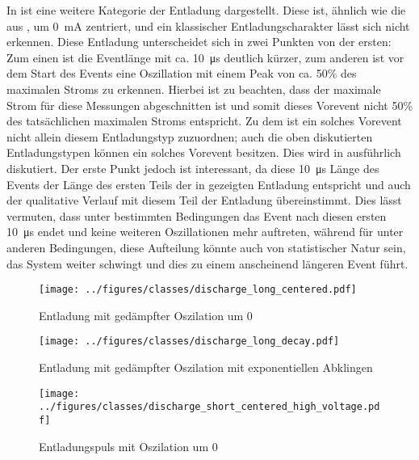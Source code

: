 In  ist eine weitere Kategorie der Entladung dargestellt. Diese ist, ähnlich wie die aus , um \SI{0}{\milli\ampere} zentriert, und ein klassischer Entladungscharakter lässt sich nicht erkennen. Diese Entladung unterscheidet sich in zwei Punkten von der ersten: Zum einen ist die Eventlänge mit ca. \SI{10}{\micro\second} deutlich kürzer, zum anderen ist vor dem Start des Events eine Oszillation mit einem Peak von ca. 50\% des maximalen Stroms zu erkennen. Hierbei ist zu beachten, dass der maximale Strom für diese Messungen abgeschnitten ist und somit dieses Vorevent nicht 50\% des tatsächlichen maximalen Stroms entspricht. Zu dem ist ein solches Vorevent nicht allein diesem Entladungstyp zuzuordnen; auch die oben diskutierten Entladungstypen können ein solches Vorevent besitzen. Dies wird in  ausführlich diskutiert. Der erste Punkt jedoch ist interessant, da diese \SI{10}{\micro\second} Länge des Events der Länge des ersten Teils der in  gezeigten Entladung entspricht und auch der qualitative Verlauf mit diesem Teil der Entladung übereinstimmt. Dies lässt vermuten, dass unter bestimmten Bedingungen das Event nach diesen ersten \SI{10}{\micro\second} endet und keine weiteren Oszillationen mehr auftreten, während für unter anderen Bedingungen, diese Aufteilung könnte auch von statistischer Natur sein, das System weiter schwingt und dies zu einem anscheinend längeren Event führt.

\begin{figure}[H]
    \centering
    \texttt{[image: ../figures/classes/discharge\_long\_centered.pdf]}
    \caption{Entladung mit gedämpfter Oszilation um 0}
    \label{fig:discharge-long-centered}
\end{figure}

\begin{figure}[H]
    \centering
    \texttt{[image: ../figures/classes/discharge\_long\_decay.pdf]}
    \caption{Entladung mit gedämpfter Oszilation mit exponentiellen Abklingen}
    \label{fig:discharge-long-decay}
\end{figure}

\begin{figure}[H]
    \centering
    \texttt{[image: ../figures/classes/discharge\_short\_centered\_high\_voltage.pdf]}
    \caption{Entladungspuls mit Oszilation um 0}
    \label{fig:discharge-short-centered}
\end{figure}





